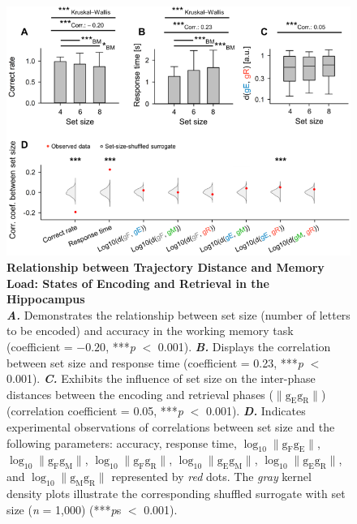 \documentclass[final,3p,times,twocolumn]{elsarticle}
\begin{document}
        \clearpage
        \begin{figure}[ht]
        	\centering
            \includegraphics[width=1\textwidth]{./src/figures/.png/Figure_ID_03.png}
        	\caption{\textbf{
Relationship between Trajectory Distance and Memory Load: States of Encoding and Retrieval in the Hippocampus
}
\smallskip
\\
\textbf{\textit{A.}} Demonstrates the relationship between set size (number of letters to be encoded) and accuracy in the working memory task (coefficient = $-0.20$, ***\textit{p} $<$ 0.001). \textbf{\textit{B.}} Displays the correlation between set size and response time (coefficient = 0.23, ***\textit{p} $<$ 0.001). \textbf{\textit{C.}} Exhibits the influence of set size on the inter-phase distances between the encoding and retrieval phases ($\lVert \mathrm{g_{E}g_{R}} \rVert$) (correlation coefficient = 0.05, ***\textit{p} $<$ 0.001). \textbf{\textit{D.}} Indicates experimental observations of correlations between set size and the following parameters: accuracy, response time, $\log_{10}{\lVert \mathrm{g_{F}g_{E}} \rVert}$, $\log_{10}{\lVert \mathrm{g_{F}g_{M}} \rVert}$, $\log_{10}{\lVert \mathrm{g_{F}g_{R}} \rVert}$, $\log_{10}{\lVert \mathrm{g_{E}g_{M}} \rVert}$, $\log_{10}{\lVert \mathrm{g_{E}g_{R}} \rVert}$, and $\log_{10}{\lVert \mathrm{g_{M}g_{R}} \rVert}$ represented by \textit{red} dots. The \textit{gray} kernel density plots illustrate the corresponding shuffled surrogate with set size (\textit{n} = 1,000) (***\textit{p}s $<$ 0.001).
}
        	\label{fig:03}
        \end{figure}
\end{document}
